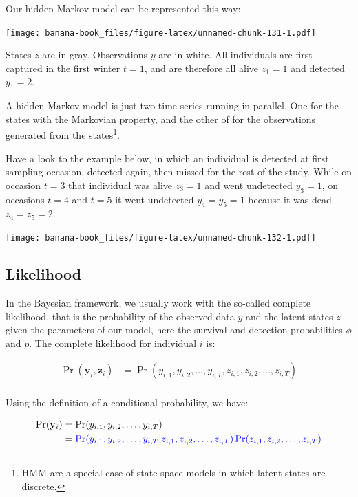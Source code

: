 \documentclass[
  12pt,
]{krantz}
\makeatletter
\newenvironment{kframe}{%
\medskip{}
\setlength{\fboxsep}{.8em}
 \def\at@end@of@kframe{}%
 \ifinner\ifhmode%
  \def\at@end@of@kframe{\end{minipage}}%
  \begin{minipage}{\columnwidth}%
 \fi\fi%
 \def\FrameCommand##1{\hskip\@totalleftmargin \hskip-\fboxsep
 \colorbox{shadecolor}{##1}\hskip-\fboxsep
     \hskip-\linewidth \hskip-\@totalleftmargin \hskip\columnwidth}%
 \MakeFramed {\advance\hsize-\width
   \@totalleftmargin\z@ \linewidth\hsize
   \@setminipage}}%
 {\par\unskip\endMakeFramed%
 \at@end@of@kframe}
\newenvironment{rmdblock}[1]
  {
  \begin{itemize}
  \renewcommand{\labelitemi}{
    \raisebox{-.7\height}[0pt][0pt]{
      {\setkeys{Gin}{width=3em,keepaspectratio}\texttt{[image: images/\#1]}}
    }
  }
  \setlength{\fboxsep}{1em}
  \begin{kframe}
  \item
  }
  {
  \end{kframe}
  \end{itemize}
  }
\newenvironment{rmdnote}
  {\begin{rmdblock}{note}}
  {\end{rmdblock}}
\makeatother
\begin{document}
Our hidden Markov model can be represented this way:

\texttt{[image: banana-book\_files/figure-latex/unnamed-chunk-131-1.pdf]}

States \(z\) are in gray. Observations \(y\) are in white. All individuals are first captured in the first winter \(t = 1\), and are therefore all alive \(z_1 = 1\) and detected \(y_1 = 2\).

\begin{rmdnote}
A hidden Markov model is just two time series running in parallel. One for the states with the Markovian property, and the other of for the observations generated from the states\footnote{HMM are a special case of state-space models in which latent states are discrete.}.
\end{rmdnote}

Have a look to the example below, in which an individual is detected at first sampling occasion, detected again, then missed for the rest of the study. While on occasion \(t=3\) that individual was alive \(z_3=1\) and went undetected \(y_3=1\), on occasions \(t=4\) and \(t=5\) it went undetected \(y_4=y_5=1\) because it was dead \(z_4=z_5=2\).

\texttt{[image: banana-book\_files/figure-latex/unnamed-chunk-132-1.pdf]}

\hypertarget{likelihoodhmm}{%
\subsection{Likelihood}\label{likelihoodhmm}}

In the Bayesian framework, we usually work with the so-called complete likelihood, that is the probability of the observed data \(y\) and the latent states \(z\) given the parameters of our model, here the survival and detection probabilities \(\phi\) and \(p\). The complete likelihood for individual \(i\) is:

\begin{align*}
\Pr(\mathbf{y}_i, \mathbf{z}_i) &= \Pr(y_{i,1}, y_{i,2}, \ldots, y_{i,T}, z_{i,1}, z_{i,2}, \ldots, z_{i,T})\\
\end{align*}

Using the definition of a conditional probability, we have:

\begin{align*}
\Pr(\mathbf{y}_i) &= \Pr(y_{i,1}, y_{i,2}, \ldots, y_{i,T})\\
                  &= \color{blue}{\Pr(y_{i,1}, y_{i,2}, \ldots, y_{i,T} | z_{i,1}, z_{i,2}, \ldots, z_{i,T}) \Pr(z_{i,1}, z_{i,2}, \ldots, z_{i,T})}\\
\end{align*}
\end{document}
